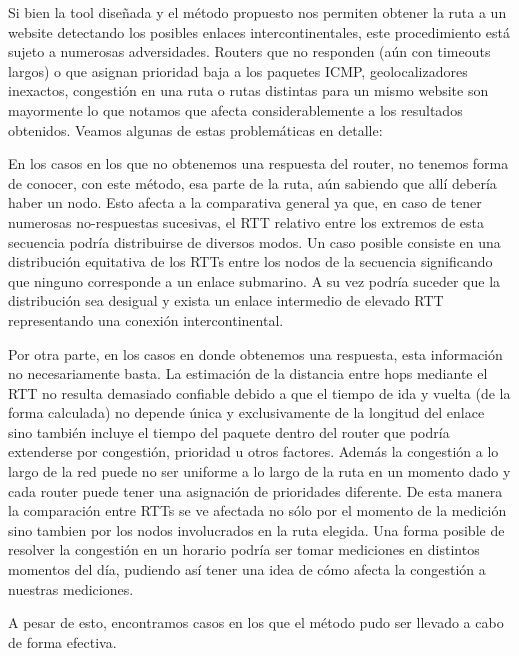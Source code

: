 Si bien la tool diseñada y el método propuesto nos permiten obtener la ruta a un website detectando los posibles enlaces intercontinentales, este procedimiento está sujeto a numerosas adversidades. Routers que no responden (aún con timeouts largos) o que asignan prioridad baja a los paquetes ICMP,  geolocalizadores inexactos, congestión en una ruta o rutas distintas para un mismo website son mayormente lo que notamos que afecta considerablemente a los resultados obtenidos.  Veamos algunas de estas problemáticas en detalle:

En los casos en los que no obtenemos una respuesta del router, no tenemos forma de conocer, con este método, esa parte de la ruta, aún sabiendo que allí debería haber un nodo. Esto afecta a la comparativa general ya que, en caso de tener numerosas no-respuestas sucesivas, el RTT relativo entre los extremos de esta secuencia podría distribuirse de diversos modos. Un caso posible consiste en una distribución equitativa de los RTTs entre los nodos de la secuencia significando que ninguno corresponde a un enlace submarino. A su vez podría suceder que la distribución sea desigual y exista un enlace intermedio de elevado RTT representando una conexión intercontinental.

Por otra parte, en los casos en donde obtenemos una respuesta, esta información no necesariamente basta. La estimación de la distancia entre hops mediante el RTT no resulta demasiado confiable debido a que el tiempo de ida y vuelta (de la forma calculada) no depende única y exclusivamente de la longitud del enlace sino también incluye el tiempo del paquete dentro del router que podría extenderse por congestión, prioridad u otros factores. Además la congestión a lo largo de la red puede no ser uniforme a lo largo de la ruta en un momento dado y cada router puede tener una asignación de prioridades diferente. De esta manera la comparación entre RTTs se ve afectada no sólo por el momento de la medición sino tambien por los nodos involucrados en la ruta elegida. Una forma posible de resolver la congestión en un horario podría ser tomar mediciones en distintos momentos del día, pudiendo así tener una idea de cómo afecta la congestión a nuestras mediciones.

A pesar de esto, encontramos casos en los que el método pudo ser llevado a cabo de forma efectiva.
